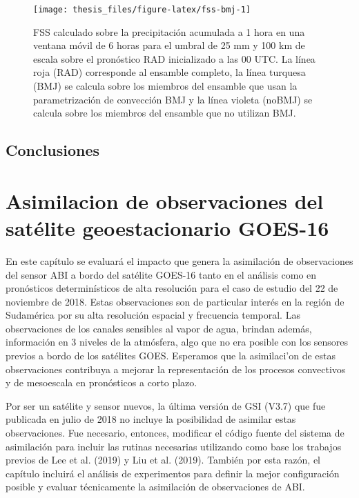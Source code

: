 \documentclass[12pt,oneside]{reedthesis}
\begin{document}
\begin{figure}
\texttt{[image: thesis\_files/figure-latex/fss-bmj-1]} \caption{FSS calculado sobre la precipitación acumulada a 1 hora en una ventana móvil de 6 horas para el umbral de 25 mm y 100 km de escala sobre el pronóstico RAD inicializado a las 00 UTC. La línea roja (RAD) corresponde al ensamble completo, la línea turquesa (BMJ) se calcula sobre los miembros del ensamble que usan la parametrización de convección BMJ y la línea violeta (noBMJ) se calcula sobre los miembros del ensamble que no utilizan BMJ.}\label{fig:fss-bmj}
\end{figure}
\hypertarget{conclusiones-1}{%
\section{Conclusiones}\label{conclusiones-1}}

\hypertarget{asimilacion-de-observaciones-del-satuxe9lite-geoestacionario-goes-16}{%
\chapter{Asimilacion de observaciones del satélite geoestacionario GOES-16}\label{asimilacion-de-observaciones-del-satuxe9lite-geoestacionario-goes-16}}

En este capítulo se evaluará el impacto que genera la asimilación de observaciones del sensor ABI a bordo del satélite GOES-16 tanto en el análisis como en pronósticos determinísticos de alta resolución para el caso de estudio del 22 de noviembre de 2018. Estas observaciones son de particular interés en la región de Sudamérica por su alta resolución espacial y frecuencia temporal. Las observaciones de los canales sensibles al vapor de agua, brindan además, información en 3 niveles de la atmósfera, algo que no era posible con los sensores previos a bordo de los satélites GOES. Esperamos que la asimilaci'on de estas observaciones contribuya a mejorar la representación de los procesos convectivos y de mesoescala en pronósticos a corto plazo.

Por ser un satélite y sensor nuevos, la última versión de GSI (V3.7) que fue publicada en julio de 2018 no incluye la posibilidad de asimilar estas observaciones. Fue necesario, entonces, modificar el código fuente del sistema de asimilación para incluir las rutinas necesarias utilizando como base los trabajos previos de Lee et al. (2019) y Liu et al. (2019). También por esta razón, el capítulo incluirá el análisis de experimentos para definir la mejor configuración posible y evaluar técnicamente la asimilación de observaciones de ABI.
\end{document}
